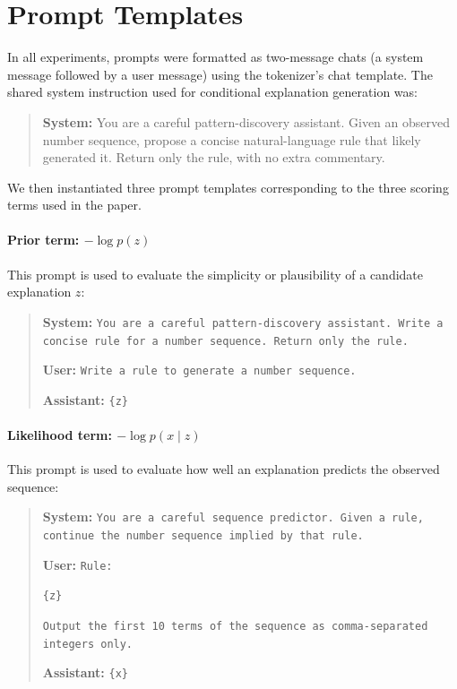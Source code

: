 \documentclass{article}
\theoremstyle{plain}
\theoremstyle{definition}
\theoremstyle{remark}
\begin{document}
\section{Prompt Templates}
\label{app:prompts}

In all experiments, prompts were formatted as two-message chats (a system message followed by a user message) using the tokenizer's chat template. The shared system instruction used for conditional explanation generation was:

\begin{quote}
\textbf{System:} You are a careful pattern-discovery assistant. Given an observed number sequence, propose a concise natural-language rule that likely generated it. Return only the rule, with no extra commentary.
\end{quote}

We then instantiated three prompt templates corresponding to the three scoring terms used in the paper.

\paragraph{Prior term: \texorpdfstring{$-\log p(z)$}{-log p(z)}}
This prompt is used to evaluate the simplicity or plausibility of a candidate explanation $z$:
\begin{quote}
\textbf{System:} \texttt{You are a careful pattern-discovery assistant. Write a concise rule for a number sequence. Return only the rule.}

\textbf{User:} \texttt{Write a rule to generate a number sequence.}

\textbf{Assistant:} \texttt{\{z\}}
\end{quote}

\paragraph{Likelihood term: \texorpdfstring{$-\log p(x \mid z)$}{-log p(x|z)}}
This prompt is used to evaluate how well an explanation predicts the observed sequence:
\begin{quote}
\textbf{System:} \texttt{You are a careful sequence predictor. Given a rule, continue the number sequence implied by that rule.}

\textbf{User:} \texttt{Rule:}

\texttt{\{z\}}

\texttt{Output the first 10 terms of the sequence as comma-separated integers only.}

\textbf{Assistant:} \texttt{\{x\}}
\end{quote}
\end{document}
